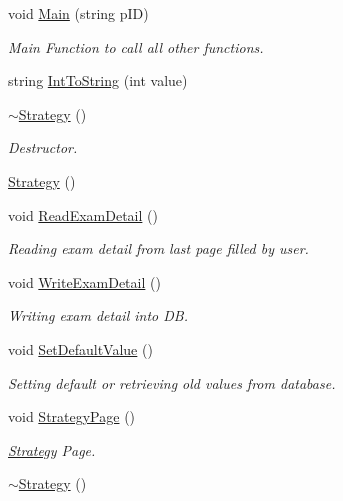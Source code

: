 \begin{DoxyCompactItemize}
\item 
void \hyperlink{classStrategy_a7d4c0323880066ee2815a3b3f20b61ea}{\-Main} (string p\-I\-D)
\begin{DoxyCompactList}\small\item\em \-Main \-Function to call all other functions. \end{DoxyCompactList}\item 
string \hyperlink{classStrategy_ab92d15ccf4d4d775f4bf9636248fba8f}{\-Int\-To\-String} (int value)
\item 
\hyperlink{classStrategy_a37c0bbdd64fd7dfcdd91578784a64775}{$\sim$\-Strategy} ()
\begin{DoxyCompactList}\small\item\em \-Destructor. \end{DoxyCompactList}\item 
\hyperlink{classStrategy_a2021a15bbc4f0d13f7b92f8933db2235}{\-Strategy} ()
\item 
void \hyperlink{classStrategy_abb7a716f8403d4ec3d5d127f789ba6ba}{\-Read\-Exam\-Detail} ()
\begin{DoxyCompactList}\small\item\em \-Reading exam detail from last page filled by user. \end{DoxyCompactList}\item 
void \hyperlink{classStrategy_a3825da44242fdf8442ffbd9cfd922803}{\-Write\-Exam\-Detail} ()
\begin{DoxyCompactList}\small\item\em \-Writing exam detail into \-D\-B. \end{DoxyCompactList}\item 
void \hyperlink{classStrategy_a5ae1ee77d05ad12afedef648f583328a}{\-Set\-Default\-Value} ()
\begin{DoxyCompactList}\small\item\em \-Setting default or retrieving old values from database. \end{DoxyCompactList}\item 
void \hyperlink{classStrategy_ac3f851b75390a71e3a4c6dfd9b15dafb}{\-Strategy\-Page} ()
\begin{DoxyCompactList}\small\item\em \hyperlink{classStrategy}{\-Strategy} \-Page. \end{DoxyCompactList}\item 
\hyperlink{classStrategy_a37c0bbdd64fd7dfcdd91578784a64775}{$\sim$\-Strategy} ()
\end{DoxyCompactItemize}
